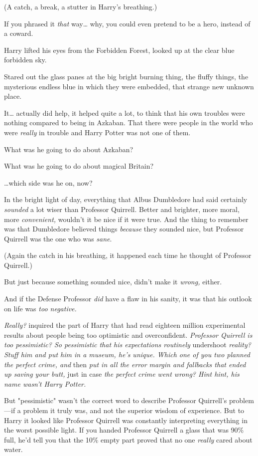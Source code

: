 (A catch, a break, a stutter in Harry's breathing.)

If you phrased it \emph{that} way{\ldots} why, you could even pretend to be a 
hero, instead of a coward.

Harry lifted his eyes from the Forbidden Forest, looked up at the clear blue 
forbidden sky.

Stared out the glass panes at the big bright burning thing, the fluffy things, 
the mysterious endless blue in which they were embedded, that strange new 
unknown place.

It{\ldots} actually did help, it helped quite a lot, to think that his own 
troubles were nothing compared to being in Azkaban. That there were people in 
the world who were \emph{really} in trouble and Harry Potter was not one of 
them.

What was he going to do about Azkaban?

What was he going to do about magical Britain?

{\ldots}which side was he on, now?

In the bright light of day, everything that Albus Dumbledore had said certainly 
\emph{sounded} a lot wiser than Professor Quirrell. Better and brighter, more 
moral, more \emph{convenient,} wouldn't it be nice if it were true. And the 
thing to remember was that Dumbledore believed things \emph{because} they 
sounded nice, but Professor Quirrell was the one who was \emph{sane}.

(Again the catch in his breathing, it happened each time he thought of 
Professor Quirrell.)

But just because something sounded nice, didn't make it \emph{wrong,} either.

And if the Defense Professor \emph{did} have a flaw in his sanity, it was that 
his outlook on life was \emph{too negative.}

\emph{Really?} inquired the part of Harry that had read eighteen million 
experimental results about people being too optimistic and overconfident. 
\emph{Professor Quirrell is too pessimistic? So pessimistic that his 
expectations routinely} undershoot\emph{ reality? Stuff him and put him in a 
museum, he's unique. Which one of you two planned the perfect crime, and} 
then\emph{ put in all the error margin and fallbacks that ended up saving your 
butt,} just in case\emph{ the perfect crime went wrong? Hint hint, his name 
wasn't Harry Potter.}

But "pessimistic" wasn't the correct word to describe Professor Quirrell's 
problem---if a problem it truly was, and not the superior wisdom of experience. 
But to Harry it looked like Professor Quirrell was constantly interpreting 
everything in the worst possible light. If you handed Professor Quirrell a 
glass that was 90\% full, he'd tell you that the 10\% empty part proved that no 
one \emph{really} cared about water.

